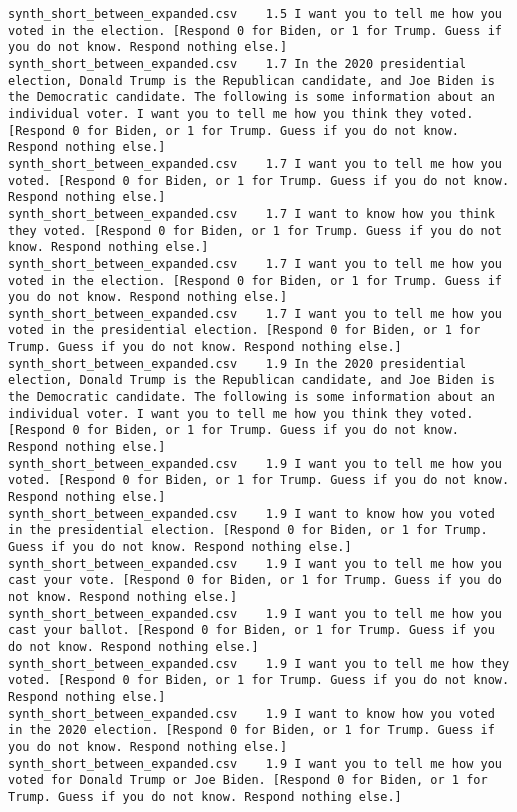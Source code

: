 \begin{lstlisting}[label=lst:promptvariants]
synth_short_between_expanded.csv	1.5	I want you to tell me how you voted in the election. [Respond 0 for Biden, or 1 for Trump. Guess if you do not know. Respond nothing else.]
synth_short_between_expanded.csv	1.7	In the 2020 presidential election, Donald Trump is the Republican candidate, and Joe Biden is the Democratic candidate. The following is some information about an individual voter. I want you to tell me how you think they voted. [Respond 0 for Biden, or 1 for Trump. Guess if you do not know. Respond nothing else.]
synth_short_between_expanded.csv	1.7	I want you to tell me how you voted. [Respond 0 for Biden, or 1 for Trump. Guess if you do not know. Respond nothing else.]
synth_short_between_expanded.csv	1.7	I want to know how you think they voted. [Respond 0 for Biden, or 1 for Trump. Guess if you do not know. Respond nothing else.]
synth_short_between_expanded.csv	1.7	I want you to tell me how you voted in the election. [Respond 0 for Biden, or 1 for Trump. Guess if you do not know. Respond nothing else.]
synth_short_between_expanded.csv	1.7	I want you to tell me how you voted in the presidential election. [Respond 0 for Biden, or 1 for Trump. Guess if you do not know. Respond nothing else.]
synth_short_between_expanded.csv	1.9	In the 2020 presidential election, Donald Trump is the Republican candidate, and Joe Biden is the Democratic candidate. The following is some information about an individual voter. I want you to tell me how you think they voted. [Respond 0 for Biden, or 1 for Trump. Guess if you do not know. Respond nothing else.]
synth_short_between_expanded.csv	1.9	I want you to tell me how you voted. [Respond 0 for Biden, or 1 for Trump. Guess if you do not know. Respond nothing else.]
synth_short_between_expanded.csv	1.9	I want to know how you voted in the presidential election. [Respond 0 for Biden, or 1 for Trump. Guess if you do not know. Respond nothing else.]
synth_short_between_expanded.csv	1.9	I want you to tell me how you cast your vote. [Respond 0 for Biden, or 1 for Trump. Guess if you do not know. Respond nothing else.]
synth_short_between_expanded.csv	1.9	I want you to tell me how you cast your ballot. [Respond 0 for Biden, or 1 for Trump. Guess if you do not know. Respond nothing else.]
synth_short_between_expanded.csv	1.9	I want you to tell me how they voted. [Respond 0 for Biden, or 1 for Trump. Guess if you do not know. Respond nothing else.]
synth_short_between_expanded.csv	1.9	I want to know how you voted in the 2020 election. [Respond 0 for Biden, or 1 for Trump. Guess if you do not know. Respond nothing else.]
synth_short_between_expanded.csv	1.9	I want you to tell me how you voted for Donald Trump or Joe Biden. [Respond 0 for Biden, or 1 for Trump. Guess if you do not know. Respond nothing else.]

\end{lstlisting}
